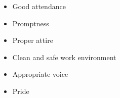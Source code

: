 \documentclass{report}
\begin{document}
    \bigbreak \noindent 
    \begin{itemize}
        \item Good attendance
        \item Promptness
        \item Proper attire
        \item Clean and safe work environment
        \item Appropriate voice
        \item Pride
    \end{itemize}


    \pagebreak
    \begin{large}
       \noindent \textbf{ } 
    \end{large}
    

    
    
\end{document}
